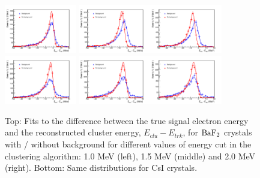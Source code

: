 \begin{figure}[htb]
\begin{center}
   \includegraphics[width=0.28\textwidth]{Figures/compFit4.pdf} \includegraphics[width=0.28\textwidth]{Figures/compFit6.pdf}\includegraphics[width=0.28\textwidth]{Figures/compFit7.pdf}
   \includegraphics[width=0.28\textwidth]{Figures/compFit5.pdf} \includegraphics[width=0.28\textwidth]{Figures/compFit8.pdf}\includegraphics[width=0.28\textwidth]{Figures/compFit9.pdf}
\end{center}
\caption
{Top: Fits to the difference between the true signal electron energy and the reconstructed cluster energy, $E_{clu}-E_{trk}$, for $\rm BaF_2$ crystals 
with / without background for different values of energy cut in the clustering algorithm: 1.0 MeV (left), 1.5 MeV (middle) and 2.0 MeV (right). Bottom: Same 
distributions for CsI crystals. }
\label{sim::fig::fitsNobkg2}
\end{figure}



